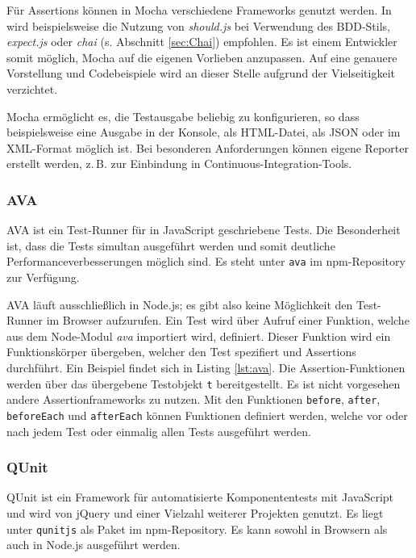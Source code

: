 Für Assertions können in Mocha verschiedene Frameworks genutzt werden. In \cite{mocha-index} wird beispielsweise die Nutzung von \textit{should.js} bei Verwendung des BDD-Stils, \textit{expect.js} oder \textit{chai} (s. Abschnitt \ref{sec:Chai}) empfohlen. Es ist einem Entwickler somit möglich, Mocha auf die eigenen Vorlieben anzupassen.\cite{mocha-index} Auf eine genauere Vorstellung und Codebeispiele wird an dieser Stelle aufgrund der Vielseitigkeit verzichtet.

Mocha ermöglicht es, die Testausgabe beliebig zu konfigurieren, so dass beispielsweise eine Ausgabe in der Konsole, als HTML-Datei, als JSON oder im XML-Format möglich ist. Bei besonderen Anforderungen können eigene Reporter erstellt werden, z.\,B. zur Einbindung in Continuous-Integration-Tools.

\subsubsection{AVA}
\label{sec:Ava}
AVA ist ein Test-Runner für in JavaScript geschriebene Tests. Die Besonderheit ist, dass die Tests simultan ausgeführt werden und somit deutliche Performanceverbesserungen möglich sind. Es steht unter \texttt{ava} im npm-Repository zur Verfügung.\cite{ava}

AVA läuft ausschließlich in Node.js; es gibt also keine Möglichkeit den Test-Runner im Browser aufzurufen. Ein Test wird über Aufruf einer Funktion, welche aus dem Node-Modul \textit{ava} importiert wird, definiert. Dieser Funktion wird ein Funktionskörper übergeben, welcher den Test spezifiert und Assertions durchführt. Ein Beispiel findet sich in Listing \ref{lst:ava}. Die Assertion-Funktionen werden über das übergebene Testobjekt \texttt{t} bereitgestellt. Es ist nicht vorgesehen andere Assertionframeworks zu nutzen. Mit den Funktionen \texttt{before}, \texttt{after}, \texttt{beforeEach} und \texttt{afterEach} können Funktionen definiert werden, welche vor oder nach jedem Test oder einmalig allen Tests ausgeführt werden.\cite{ava}

\begin{figure}[H]
	
\end{figure}

\subsubsection{QUnit}
\label{sec:QUnit}
QUnit ist ein Framework für automatisierte Komponententests mit JavaScript und wird von jQuery und einer Vielzahl weiterer Projekten genutzt. Es liegt unter \texttt{qunitjs} als Paket im npm-Repository. Es kann sowohl in Browsern als auch in Node.js ausgeführt werden.\cite{qunit-index}

